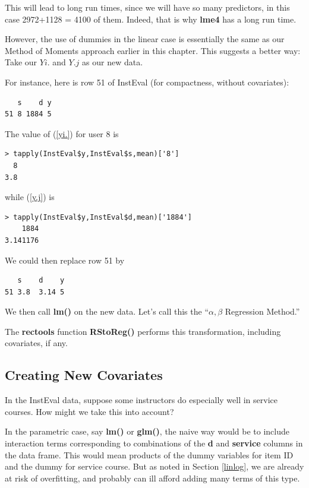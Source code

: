 This will lead to long run times, since we will have so many predictors,
in this case 2972+1128 = 4100 of them.  Indeed, that is why \textbf{lme4}
has a long run time.

However, the use of dummies in the linear case is essentially the same
as our Method of Moments approach earlier in this chapter.  This
suggests a better way:  Take our $Yi.$ and $Y.j$
as our new data.

For instance, here is row 51 of InstEval (for compactness,
without covariates):

\begin{lstlisting}
   s    d y 
51 8 1884 5       
\end{lstlisting}

The value of (\ref{yi.}) for user 8 is

\begin{lstlisting}
> tapply(InstEval$y,InstEval$s,mean)['8']
  8 
3.8 
\end{lstlisting}

while (\ref{y.j}) is

\begin{lstlisting}
> tapply(InstEval$y,InstEval$d,mean)['1884']
    1884 
3.141176 
\end{lstlisting}

We could then replace row 51 by

\begin{lstlisting}
   s    d    y 
51 3.8  3.14 5       
\end{lstlisting}

We then call \textbf{lm()} on the new data.  Let's call this the
``$\alpha,\beta$ Regression Method.''

The \textbf{rectools} function \textbf{RStoReg()} performs this
transformation, including covariates, if any.

\subsection{Creating New Covariates}

In the InstEval data, suppose some instructors do especially well in
service courses.  How might we take this into account?

In the parametric case, say \textbf{lm()} or \textbf{glm()},
the naive way would be to include interaction terms corresponding to
combinations of the \textbf{d} and \textbf{service} columns in the data
frame.  This would mean products of the dummy variables for item ID and
the dummy for service course.  But as noted in Section \ref{linlog}, we
are already at risk of overfitting, and probably can ill afford adding
many terms of this type.

